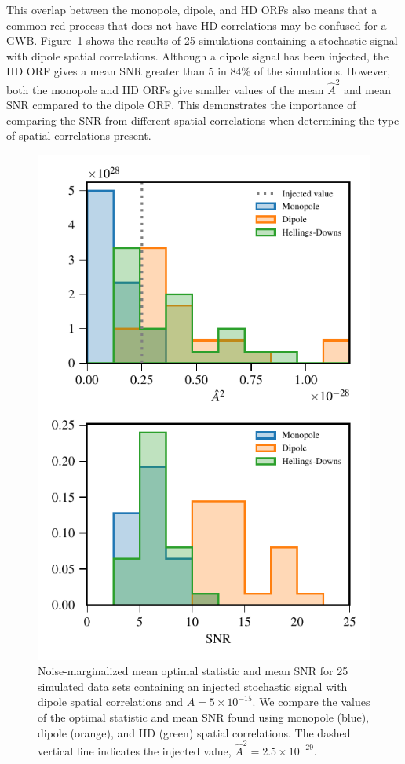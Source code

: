 \documentclass[twocolumn,aps,prd,superscriptaddress]{revtex4-1}
\begin{document}
This overlap between the monopole, dipole, and HD ORFs also means that 
a common red process that does not have HD correlations  
may be confused for a GWB. Figure~\ref{fig:os_dipole} shows the results of 25 simulations 
containing a stochastic signal with dipole spatial correlations. 
Although a dipole signal has been injected, 
the HD ORF gives a mean SNR greater than 5 in 84\% of the simulations. 
However, both the monopole and HD ORFs give smaller values of 
the mean $\hat{A}^2$ and mean SNR compared to the dipole ORF. 
This demonstrates the importance of comparing the SNR from different spatial correlations 
when determining the type of spatial correlations present.
\begin{figure}[t]
	\includegraphics[width=0.9\columnwidth]{plots/optstat_dipole_A5e-15.pdf}
	\caption{Noise-marginalized mean optimal statistic and mean SNR for 25 simulated data sets 
			containing an injected stochastic signal with dipole spatial correlations and $A = 5\times10^{-15}$. 
			We compare the values of the optimal statistic and mean SNR 
			found using monopole (blue), dipole (orange), 
			and HD (green) spatial correlations. 
			The dashed vertical line indicates the injected value, $\hat{A}^2 = 2.5 \times 10^{-29}$.}
	\label{fig:os_dipole}
\end{figure}
\end{document}
